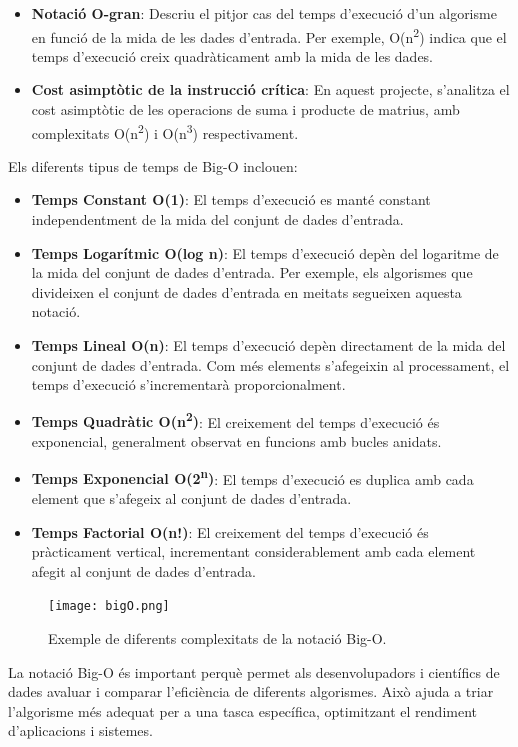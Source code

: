 \documentclass{ieeetj}
\begin{document}
\begin{itemize}
    \item \textbf{Notació O-gran}: Descriu el pitjor cas del temps d'execució d'un algorisme en funció de la mida de les dades d'entrada. Per exemple, O(n\textsuperscript{2}) indica que el temps d'execució creix quadràticament amb la mida de les dades.
    \item \textbf{Cost asimptòtic de la instrucció crítica}: En aquest projecte, s'analitza el cost asimptòtic de les operacions de suma i producte de matrius, amb complexitats O(n\textsuperscript{2}) i O(n\textsuperscript{3}) respectivament.
\end{itemize}

Els diferents tipus de temps de Big-O inclouen:
\begin{itemize}
    \item \textbf{Temps Constant O(1)}: El temps d'execució es manté constant independentment de la mida del conjunt de dades d'entrada.
    \item \textbf{Temps Logarítmic O(log n)}: El temps d'execució depèn del logaritme de la mida del conjunt de dades d'entrada. Per exemple, els algorismes que divideixen el conjunt de dades d'entrada en meitats segueixen aquesta notació.
    \item \textbf{Temps Lineal O(n)}: El temps d'execució depèn directament de la mida del conjunt de dades d'entrada. Com més elements s'afegeixin al processament, el temps d'execució s'incrementarà proporcionalment.
    \item \textbf{Temps Quadràtic O(n\textsuperscript{2})}: El creixement del temps d'execució és exponencial, generalment observat en funcions amb bucles anidats.
    \item \textbf{Temps Exponencial O(2\textsuperscript{n})}: El temps d'execució es duplica amb cada element que s'afegeix al conjunt de dades d'entrada.
    \item \textbf{Temps Factorial O(n!)}: El creixement del temps d'execució és pràcticament vertical, incrementant considerablement amb cada element afegit al conjunt de dades d'entrada.
\end{itemize}

\begin{figure}[htbp]
\centerline{\texttt{[image: bigO.png]}}
\caption{Exemple de diferents complexitats de la notació Big-O.}
\label{fig:big_o}
\end{figure}

La notació Big-O és important perquè permet als desenvolupadors i científics de dades avaluar i comparar l'eficiència de diferents algorismes. Això ajuda a triar l'algorisme més adequat per a una tasca específica, optimitzant el rendiment d'aplicacions i sistemes.
\end{document}
